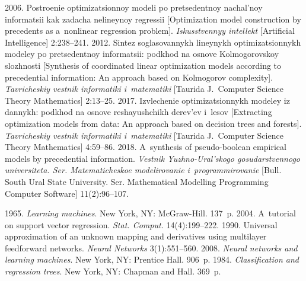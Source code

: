 \begin{multicols}{2}
{{\begin{thebibliography}{99}
 2006. Postroenie optimizatsionnoy modeli po 
pretsedentnoy nachal'noy informatsii kak zadacha nelineynoy regressii 
[Optimization model construction   by precedents 
as a~nonlinear regression problem]. 
\textit{Iskusstvennyy intellekt} [Artificial Intelligence] 2:238--241.
 2012. Sintez soglasovannykh lineynykh
op\-ti\-mi\-za\-tsi\-on\-nykh modeley po pretsedentnoy informatsii: podkhod na 
osnove Kolmogorovskoy slozhnosti [Synthesis of coordinated linear
optimization 
models according to precedential information: An
approach based on Kolmogorov complexity]. 
\textit{Tavricheskiy vestnik informatiki i~matematiki}
[Taurida J.~Computer Science Theory Mathematics] 2:13--25.
 2017. Izvlechenie optimizatsionnykh mo\-de\-ley iz dannykh: 
podkhod na osnove reshayushchikh derev'ev i~lesov [Extracting optimization 
models from data: An approach based on
decision trees and forests].
\textit{Tav\-ri\-che\-skiy vestnik informatiki i~matematiki} 
[Taurida J.~Computer Science Theory Mathematics] 4:59--86.
 2018. A~synthesis of pseudo-boolean empirical 
models by precedential information. \textit{Vestnik Yuzhno-Ural'skogo 
gosudarstvennogo universiteta. Ser.
 Ma\-te\-ma\-ti\-che\-skoe modelirovanie i~programmirovanie} 
 [Bull. South Ural State University. Ser. 
 Mathematical Modelling Programming Computer Software] 11(2):96--107.


 1965. \textit{Learning machines}. New York, NY: 
McGraw-Hill. 137~p.
 2004. A~tutorial on support vector 
regression. \textit{Stat. Comput.} 14(4):199--222.
 1990. Universal approximation of an unknown mapping and derivatives using 
 multilayer feedforward networks. \textit{Neural Networks} 3(1):551--560.
 2008. \textit{Neural networks and learning machines}. 
New York, NY: Prentice Hall. 906~p.
1984. \textit{Classification and regression trees}.
New York,  NY: Chapman and Hall. 369~p.
 \end{thebibliography}

 }
 }

\end{multicols}

